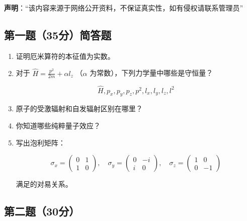 
\textbf{声明}：“该内容来源于网络公开资料，不保证真实性，如有侵权请联系管理员”

\subsection{第一题（35分）简答题}
\begin{enumerate}
    \item  证明厄米算符的本征值为实数。
    
    \item  对于 $\hat{H} = \frac{p^2}{2m} + \alpha l_z$ （$\alpha$ 为常数），下列力学量中哪些是守恒量？
    
    \[
    \hat{H}, p_x, p_y, p_z, p^2, l_x, l_y, l_z, l^2~
    \]
    
    \item  原子的受激辐射和自发辐射区别在哪里？
    
    \item  你知道哪些纯粹量子效应？
    
    \item  写出泡利矩阵：
    
    \[
    \sigma_x = \begin{pmatrix}
    0 & 1 \\
    1 & 0
    \end{pmatrix}, \quad
    \sigma_y = \begin{pmatrix}
    0 & -i \\
    i & 0
    \end{pmatrix}, \quad
    \sigma_z = \begin{pmatrix}
    1 & 0 \\
    0 & -1
    \end{pmatrix}~
    \]
    
    满足的对易关系。
\end{enumerate}
\subsection{第二题（30分）}

